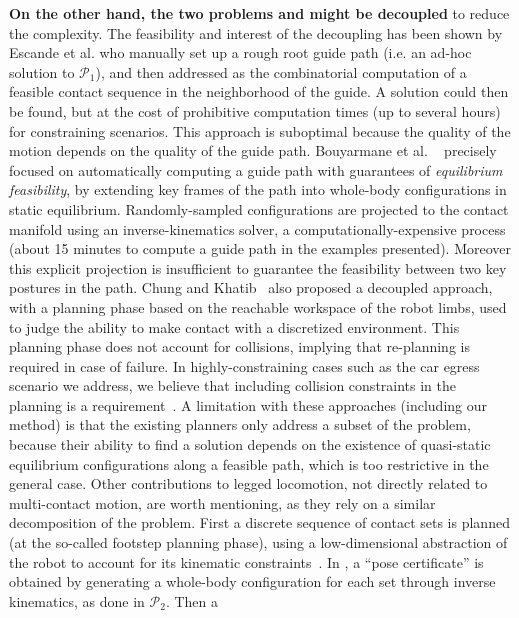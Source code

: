 \documentclass[journal]{IEEEtran}
\begin{document}
\textbf{On the other hand, the two problems \Pa and \Pb might be decoupled} to reduce the complexity. The feasibility and interest of the decoupling has been shown by Escande et al. \cite{DBLP:conf/iser/EscandeKMG08} who manually set up a rough root guide path (i.e. an ad-hoc solution to $\mathcal{P}_1$), and then addressed \Pb as the combinatorial computation of a feasible contact sequence in the neighborhood of the guide. A solution could then be found, %
but at the cost of prohibitive computation times (up to several hours) for constraining scenarios. This approach is suboptimal because the quality of the motion depends on the quality of the guide path. Bouyarmane et al. ~\cite{Bouyarmane2009} precisely focused on automatically computing a guide path with guarantees of \textit{equilibrium feasibility}, by extending key frames of the path into whole-body configurations in static equilibrium. Randomly-sampled configurations are projected to the contact manifold using an inverse-kinematics solver, a computationally-expensive process (about 15 minutes to compute a guide path in the examples presented). Moreover this explicit projection is insufficient to guarantee the feasibility between two key postures in the path. Chung and Khatib~\cite{7140082} also proposed a decoupled approach, with a planning phase based on the reachable workspace of the robot limbs, used to judge the ability to make contact with a discretized environment. This planning phase does not account for collisions, implying that re-planning is required in case of failure. In highly-constraining cases such as the car egress scenario we address, we believe that including collision constraints in the planning is a requirement~\citep{tonneauisrr15,grey2017footstep}. A limitation with
these approaches (including our method) is that the existing planners only address a subset of the problem, because their ability to find a solution depends
on the existence of quasi-static equilibrium configurations along a feasible path, which is too restrictive in the general case. Other contributions to legged locomotion, not directly related to multi-contact motion, are worth mentioning, as they rely on a similar decomposition of the problem. First a discrete sequence 
of contact sets is planned (at the so-called footstep planning phase), using a low-dimensional abstraction of the robot to account for its kinematic constraints~\cite{6078435, doi:10.1177/0278364910392608}. In \cite{doi:10.1177/0278364910392608}, a ``pose certificate'' is obtained by generating a whole-body configuration for each set through inverse kinematics, as done in $\mathcal{P}_2$. Then a
\end{document}
